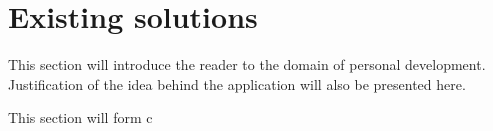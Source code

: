 
\chapter{Existing solutions}\label{ch:existing-solutions}

This section will introduce the reader to the domain of personal development.
Justification of the idea behind the application will also be presented here.

This section will form c






